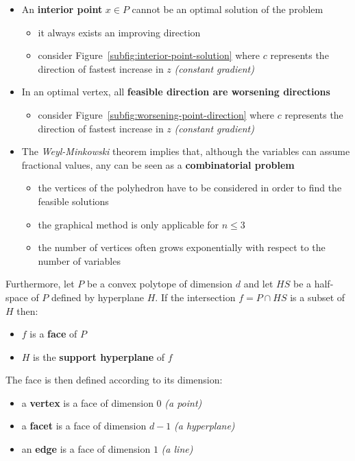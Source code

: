 \documentclass[english]{article}
\begin{document}
\begin{itemize}
  \item An \textbf{interior point} \(x \in P\) cannot be an optimal solution of the problem
        \begin{itemize}
          \item it always exists an improving direction
          \item consider Figure~\ref{subfig:interior-point-solution} where \(c\) represents the direction of fastest increase in \(z\) \textit{(constant gradient)}
        \end{itemize}
  \item In an optimal vertex, all \textbf{feasible direction are worsening directions}
        \begin{itemize}
          \item consider Figure~\ref{subfig:worsening-point-direction} where \(c\) represents the direction of fastest increase in \(z\) \textit{(constant gradient)}
        \end{itemize}
  \item The \textit{Weyl-Minkowski} theorem implies that, although the variables can assume fractional values, any \LP can be seen as a \textbf{combinatorial problem}
        \begin{itemize}
          \item {} the vertices of the polyhedron have to be considered in order to find the feasible solutions
          \item the graphical method is only applicable for \(n \leq 3\)
          \item the number of vertices often grows exponentially with respect to the number of variables
        \end{itemize}
\end{itemize}

\bigskip
Furthermore, let \(P\) be a convex polytope of dimension \(d\) and let \(HS\) be a half-space of \(P\) defined by hyperplane \(H\).
If the intersection \(f = P \cap HS\) is a subset of \(H\) then:

\begin{itemize}
  \item \(f\) is a \textbf{face} of \(P\)
  \item \(H\) is the \textbf{support hyperplane} of \(f\)
\end{itemize}

The face is then defined according to its dimension:

\begin{itemize}
  \item a \textbf{vertex} is a face of dimension \(0\) \textit{(a point)}
  \item a \textbf{facet} is a face of dimension \(d-1\) \textit{(a hyperplane)}
  \item an \textbf{edge} is a face of dimension \(1\) \textit{(a line)}
\end{itemize}
\end{document}
